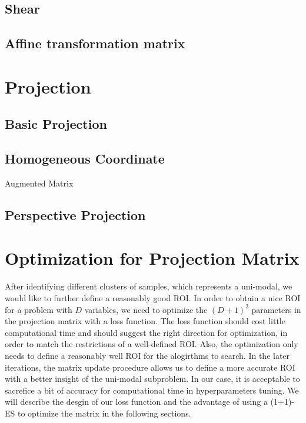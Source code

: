 \subsection{Shear}
\subsection{Affine transformation matrix}






\section{Projection}

\subsection{Basic Projection}


\subsection{Homogeneous Coordinate}
Augmented Matrix



\subsection{Perspective Projection}





\section{Optimization for Projection Matrix}

After identifying different clusters of samples, which represents a uni-modal, 
we would like to further define a reasonably good ROI.
In order to obtain a nice ROI for a problem with $D$ variables, 
we need to optimize the $(D+1)^2$ parameters in the projection matrix with a loss function.
The loss function should cost little computational time and should suggest the right direction for optimization, 
in order to match the restrictions of a well-defined ROI.
Also, the optimization only needs to define a reasonably well ROI for the alogirthms to search.  
In the later iterations, the matrix update procedure allows us to define a more accurate ROI with a better insight of the uni-modal subproblem.
In our case, it is acceptable to sacrefice a bit of accuracy for computational time in hyperparameters tuning.  
We will describe the desgin of our loss function and the advantage of using a (1+1)-ES to optimize the matrix in the following sections.  


